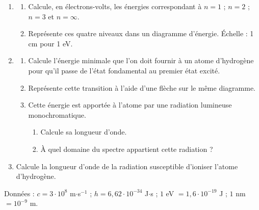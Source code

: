 \documentclass[11pt]{article}
\begin{document}
\begin{enumerate}
  \item \begin{enumerate}[label=\alph*.]
    \item Calcule, en électrons-volts, les énergies correspondant à $n = 1$ ; $n = 2$ ; $n = 3$ et $n = \infty$.
    \item Représente ces quatre niveaux dans un diagramme d'énergie. Échelle : 1 cm pour 1 eV.
  \end{enumerate}
  \item \begin{enumerate}[label=\alph*.]
    \item Calcule l'énergie minimale que l'on doit fournir à un atome d'hydrogène pour qu'il passe de l'état fondamental au premier état excité.
    \item Représente cette transition à l'aide d'une flèche sur le même diagramme.
    \item Cette énergie est apportée à l'atome par une radiation lumineuse monochromatique.
    \begin{enumerate}[label=c.\arabic*.]
      \item Calcule sa longueur d'onde.
      \item À quel domaine du spectre appartient cette radiation ?
    \end{enumerate}
  \end{enumerate}
  \item Calcule la longueur d'onde de la radiation susceptible d'ioniser l'atome d'hydrogène.
\end{enumerate}
\noindent Données : $c = 3\cdot10^8$ m$\cdot$s$^{-1}$ ; $h = 6{,}62\cdot10^{-34}$ J$\cdot$s ; $1$ eV $= 1{,}6\cdot10^{-19}$ J ; $1$ nm $= 10^{-9}$ m.

\begin{center}
\end{center}


\end{document}
